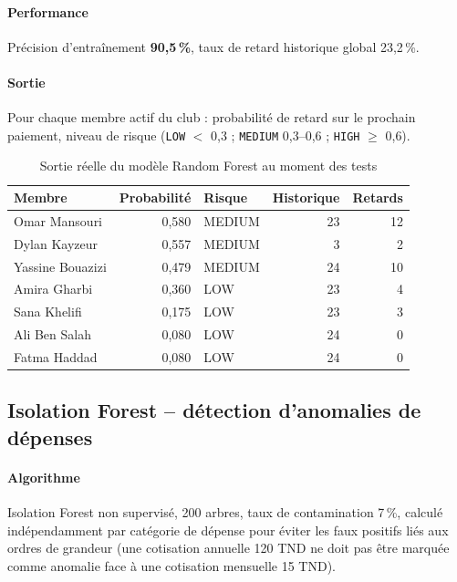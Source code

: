\documentclass[11pt,a4paper]{article}
\begin{document}
\paragraph{Performance} Précision d'entraînement \textbf{90{,}5\,\%}, taux de retard historique global 23{,}2\,\%.

\paragraph{Sortie} Pour chaque membre actif du club : probabilité de retard sur le prochain paiement, niveau de risque (\texttt{LOW} \(<\) 0{,}3 ; \texttt{MEDIUM} 0{,}3--0{,}6 ; \texttt{HIGH} \(\geq\) 0{,}6).

\begin{table}[h]
  \centering
  \footnotesize
  \begin{tabularx}{\linewidth}{Xrlrr}
    \toprule
    \textbf{Membre} & \textbf{Probabilité} & \textbf{Risque} & \textbf{Historique} & \textbf{Retards} \\
    \midrule
    Omar Mansouri    & 0{,}580 & MEDIUM & 23 & 12 \\
    Dylan Kayzeur    & 0{,}557 & MEDIUM &  3 &  2 \\
    Yassine Bouazizi & 0{,}479 & MEDIUM & 24 & 10 \\
    Amira Gharbi     & 0{,}360 & LOW    & 23 &  4 \\
    Sana Khelifi     & 0{,}175 & LOW    & 23 &  3 \\
    Ali Ben Salah    & 0{,}080 & LOW    & 24 &  0 \\
    Fatma Haddad     & 0{,}080 & LOW    & 24 &  0 \\
    \bottomrule
  \end{tabularx}
  \caption{Sortie réelle du modèle Random Forest au moment des tests}
\end{table}

\subsection{Isolation Forest -- détection d'anomalies de dépenses}

\paragraph{Algorithme} Isolation Forest non supervisé, 200 arbres, taux de contamination 7\,\%, calculé indépendamment par catégorie de dépense pour éviter les faux positifs liés aux ordres de grandeur (une cotisation annuelle 120 TND ne doit pas être marquée comme anomalie face à une cotisation mensuelle 15 TND).
\end{document}
